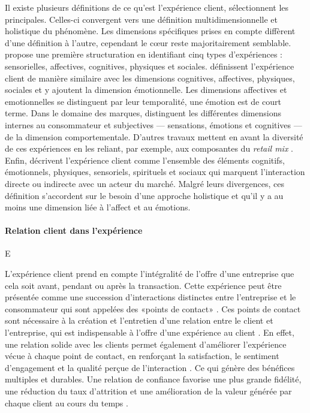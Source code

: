 \documentclass[a4paper,12pt]{report}
\begin{document}
Il existe plusieurs définitions de ce qu'est l'expérience client, \textcite{lemon16} sélectionnent les principales. Celles-ci convergent vers une définition multidimensionnelle et holistique du phénomène. Les dimensions spécifiques prises en compte diffèrent d'une définition à l'autre, cependant le cœur reste majoritairement semblable. \textcite{schmitt99} propose une première structuration en identifiant cinq types d’expériences : sensorielles, affectives, cognitives, physiques et sociales. \textcite{verhoef09} définissent l'expérience client de manière similaire avec les dimensions cognitives, affectives, physiques, sociales et y ajoutent la dimension émotionnelle. Les dimensions affectives et emotionnelles se distinguent par leur temporalité, une émotion est de court terme. Dans le domaine des marques, \textcite{brakus09} distinguent les différentes dimensions internes au consommateur et subjectives — sensations, émotions et cognitives — de la dimension comportementale. D'autres travaux mettent en avant la diversité de ces expériences en les reliant, par exemple, aux composantes du \emph{retail mix} \parencite{grewal09}. Enfin, \textcite{dekeyser15} décrivent l'expérience client comme l'ensemble des éléments cognitifs, émotionnels, physiques, sensoriels, spirituels et sociaux qui marquent l'interaction directe ou indirecte avec un acteur du marché. Malgré leurs divergences, ces définition s'accordent sur le besoin d'une approche holistique et qu'il y a au moins une dimension liée à l'affect et au émotions.  \par

\paragraph{Relation client dans l'expérience} E

L'expérience client prend en compte l'intégralité de l'offre d'une entreprise que cela soit avant, pendant ou après la transaction. Cette expérience peut être présentée comme une succession d'interactions distinctes entre l'entreprise et le consommateur qui sont appelées des «\;points de contact\;» \parencite{homburg17}. Ces points de contact sont nécessaire à la création et l'entretien d'une relation entre le client et l'entreprise, qui est indispensable à l'offre d'une expérience au client \parencite{schmitt03}. En effet, une relation solide avec les clients permet également d'améliorer l'expérience vécue à chaque point de contact, en renforçant la satisfaction, le sentiment d'engagement et la qualité perçue de l'interaction \parencite{lemon16}. Ce qui génère des bénéfices multiples et durables. Une relation de confiance favorise une plus grande fidélité, une réduction du taux d'attrition et une amélioration de la valeur générée par chaque client au cours du temps \parencite{palmatier06}.
\end{document}
